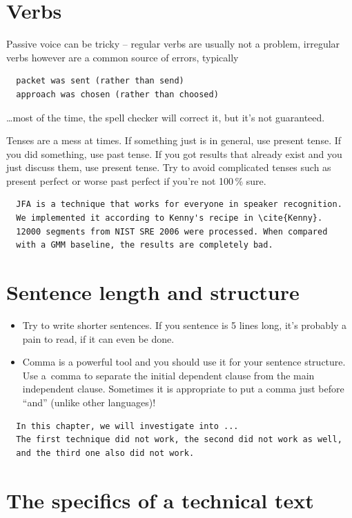 \section{Verbs}

Passive voice can be tricky -- regular verbs are usually not a problem, irregular verbs however are a common source of errors, typically
\begin{verbatim}
  packet was sent (rather than send)
  approach was chosen (rather than choosed)
\end{verbatim}
\noindent \ldots most of the time, the spell checker will correct it, but it's not guaranteed.

Tenses are a mess at times. If something just is in general, use present tense. If you did something, use past tense. If you got results that already exist and you just discuss them, use present tense. Try to avoid complicated tenses such as present perfect or worse past perfect if you're not 100\,\% sure.
\begin{verbatim}
  JFA is a technique that works for everyone in speaker recognition. 
  We implemented it according to Kenny's recipe in \cite{Kenny}. 
  12000 segments from NIST SRE 2006 were processed. When compared 
  with a GMM baseline, the results are completely bad. 
\end{verbatim}

\section{Sentence length and structure}

\begin{itemize}
  \item{Try to write shorter sentences. If you sentence is 5 lines long, it's probably a pain to read, if it can even be done.}
  \item{Comma is a powerful tool and you should use it for your sentence structure. Use a~comma to separate the initial dependent clause from the main independent clause. Sometimes it is appropriate to put a comma just before ``and'' (unlike other languages)!}
\end{itemize}
\begin{verbatim}
  In this chapter, we will investigate into ... 
  The first technique did not work, the second did not work as well, 
  and the third one also did not work. 
\end{verbatim}

\section{The specifics of a technical text}


